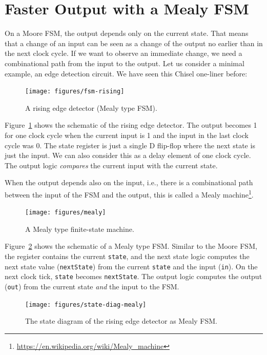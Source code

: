 \documentclass[%
    10pt,
    headinclude, footexclude,
    openright, %
    notitlepage,
    cleardoubleempty,
    headsepline,
    pointlessnumbers,
    bibtotoc, idxtotoc,
    ]{scrbook}
\newcommand{\code}[1]{{\lstinline[basicstyle=\small\ttfamily]{#1}}}
\newcommand{\myref}[2]{\href{#1}{#2}}
\renewcommand{\myref}[2]{{#2}{\footnote{\url{#1}}}}
\begin{document}
\section{Faster Output with a Mealy FSM}

On a Moore FSM, the output depends only on the current state.
That means that a change of an input can be seen as a change of the
output no earlier than in the next clock cycle.
If we want to observe an immediate change, we need a combinational
path from the input to the output.
Let us consider a minimal example, an edge detection circuit.
We have seen this Chisel one-liner before:


\begin{figure}
  \centering
  \texttt{[image: figures/fsm-rising]}
  \caption{A rising edge detector (Mealy type FSM).}
  \label{fig:fsm-rising}
\end{figure}

Figure~\ref{fig:fsm-rising} shows the schematic of the rising edge detector.
The output becomes 1 for one clock cycle when the current input is 1
and the input in the last clock cycle was 0.
The state register is just a single D flip-flop where the next state
is just the input. We can also consider this as a delay element of one
clock cycle. The output logic \emph{compares} the current
input with the current state.



When the output depends also on the input, i.e., there is a combinational path between
the input of the FSM and the output, this is called a
\myref{https://en.wikipedia.org/wiki/Mealy_machine}{Mealy machine}.

\begin{figure}
  \centering
  \texttt{[image: figures/mealy]}
  \caption{A Mealy type finite-state machine.}
  \label{fig:mealy}
\end{figure}

Figure~\ref{fig:mealy} shows the schematic of a Mealy type FSM.
Similar to the Moore FSM, the register contains the current \code{state}, and
the next state logic computes the next state value (\code{nextState})
from the current \code{state} and the input (\code{in}).
On the next clock tick, \code{state} becomes \code{nextState}.
The output logic computes the output (\code{out}) from the current state
\emph{and} the input to the FSM.


\begin{figure}
  \centering
  \texttt{[image: figures/state-diag-mealy]}
  \caption{The state diagram of the rising edge detector as Mealy FSM.}
  \label{fig:diag:mealy}
\end{figure}
\end{document}
